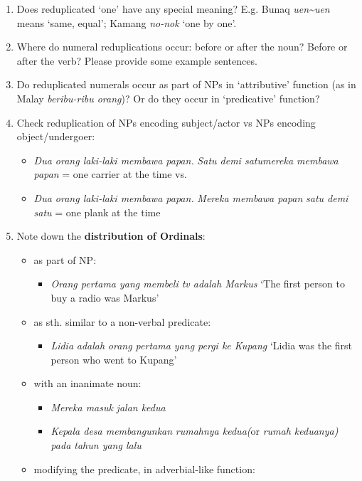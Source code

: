 \begin{enumerate}
\item Does reduplicated `one' have any special meaning? E.g. Bunaq \textit{uen\~{}uen} means `same, equal'; Kamang \textit{no-nok} `one by one'.
\item Where do numeral reduplications occur: before or after the noun? Before or after the verb? Please provide some example sentences.
\item Do reduplicated numerals occur as part of NPs in `attributive' function (as in Malay \textit{beribu-ribu orang})? Or do they occur in `predicative' function? 
\item  Check reduplication of NPs encoding subject/actor vs NPs encoding object/undergoer: 
\begin{itemize}
\item \textit{Dua orang laki-laki membawa papan.} \textit{Satu demi satu}\textit{mereka membawa papan} = one carrier at the time vs. 
\item \textit{Dua orang laki-laki membawa papan.} \textit{Mereka membawa papan} \textit{satu demi satu} = one plank at the time
\end{itemize}
\item  Note down the \textbf{distribution of Ordinals}: 
\begin{itemize}
\item as part of NP: 
\begin{itemize}
\item \textit{Orang pertama yang membeli tv adalah Markus} `The first person to buy a radio was Markus'  
\end{itemize}
\item as sth. similar to a non-verbal predicate: 
\begin{itemize}
\item \textit{Lidia} \textit{adalah} \textit{orang pertama yang pergi ke Kupang} `Lidia was the first person who went to Kupang' 
\end{itemize}
\item with an inanimate noun: 
\begin{itemize}
\item \textit{Mereka masuk} \textit{jalan kedua}
\item \textit{Kepala desa membangunkan} \textit{rumahnya kedua}\textit{(}or \textit{rumah keduanya}\textit{) pada tahun yang lalu } 
\end{itemize}
\item modifying the predicate, in adverbial-like function: 

\end{itemize}
\end{enumerate}
